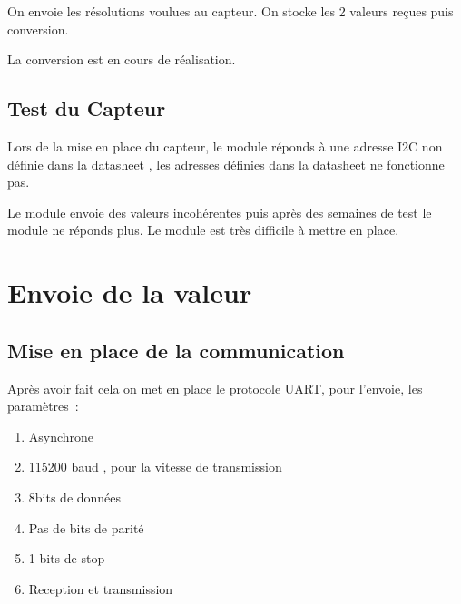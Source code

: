 \noindent On envoie les r\'{e}solutions voulues au capteur. On stocke les 2 valeurs re\c{c}ues puis conversion.

\noindent La conversion est en cours de r\'{e}alisation.

\noindent 

\noindent 

\noindent 

\noindent 

\noindent 

\noindent 

\noindent 

\noindent 

\noindent 


\section{ Test du Capteur }

\noindent 

\noindent 

\noindent Lors de la mise en place du capteur, le module r\'{e}ponds \`{a} une adresse I2C non d\'{e}finie dans la datasheet , les adresses d\'{e}finies dans la datasheet ne fonctionne pas.

\noindent Le module envoie des valeurs incoh\'{e}rentes puis apr\`{e}s des semaines de test le module ne r\'{e}ponds plus. Le module est tr\`{e}s difficile \`{a} mettre en place.

\noindent 

\noindent \eject 


\chapter{ Envoie de la valeur}


\section{ Mise en place de la communication}

\noindent Apr\`{e}s avoir fait cela on met en place le protocole UART, pour l'envoie, les param\`{e}tres~:

\begin{enumerate}
\item  Asynchrone

\item  115200 baud , pour la vitesse de transmission

\item  8bits de donn\'{e}es 

\item  Pas de bits de parit\'{e}

\item  1 bits de stop

\item  Reception et transmission
\end{enumerate}

